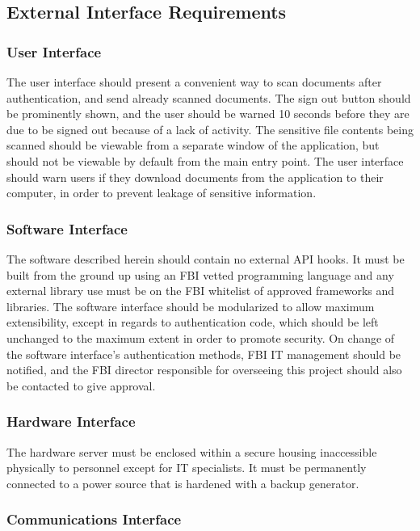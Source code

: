 \documentclass[12pt]{article}
\begin{document}
\subsection{External Interface Requirements}

\subsubsection{User Interface}

The user interface should present a convenient way to scan documents after authentication, and send already
scanned documents. The sign out button should be prominently shown, and the user should be warned 10 seconds
before they are due to be signed out because of a lack of activity. The sensitive file contents being scanned
should be viewable from a separate window of the application, but should not be viewable by default from the
main entry point. The user interface should warn users if they download documents from the application to their
computer, in order to prevent leakage of sensitive information.

\subsubsection{Software Interface}

The software described herein should contain no external API hooks. It must be built from the ground up using
an FBI vetted programming language and any external library use must be on the FBI whitelist of approved
frameworks and libraries. The software interface should be modularized to allow maximum extensibility, except
in regards to authentication code, which should be left unchanged to the maximum extent in order to promote
security. On change of the software interface’s authentication methods, FBI IT management should be notified,
and the FBI director responsible for overseeing this project should also be contacted to give approval.

\subsubsection{Hardware Interface}

The hardware server must be enclosed within a secure housing inaccessible physically to personnel except for
IT specialists. It must be permanently connected to a power source that is hardened with a backup generator.

\subsubsection{Communications Interface}
\end{document}
